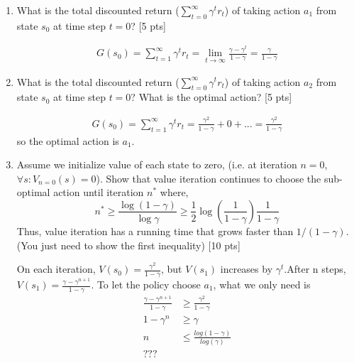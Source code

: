 \documentclass[11pt]{article}
\begin{document}
\begin{enumerate}[label=(\alph*)]
\item What is the total discounted return ($\sum_{t=0}^{\infty}\gamma^t r_t$) of taking action $a_1$ from state $s_0$ at time step $t=0$? [5 pts]

\begin{tcolorbox}[breakable]
  \begin{equation}
    \begin{aligned}
      G(s_0)=\sum_{t=1}^{\infty}\gamma^t r_t=\lim_{t\rightarrow \infty}\frac{\gamma-\gamma^t}{1-\gamma}=\frac{\gamma}{1-\gamma}
    \end{aligned}
  \end{equation}
\end{tcolorbox}

\item What is the total discounted return ($\sum_{t=0}^{\infty}\gamma^t r_t$) of taking action $a_2$ from state $s_0$ at time step $t=0$? What is the optimal action? [5 pts]

\begin{tcolorbox}[breakable]
  \begin{equation}
    \begin{aligned}
      G(s_0)=\sum_{t=1}^{\infty}\gamma^t r_t=\frac{\gamma^2}{1-\gamma}+0+...=\frac{\gamma^2}{1-\gamma}
    \end{aligned}
  \end{equation}so the optimal action is $a_1$.
\end{tcolorbox}

\item Assume we initialize value of each state to zero, (i.e. at iteration $n=0$, $\forall s: V_{n=0}(s) = 0$). Show that value iteration continues to choose the sub-optimal action until iteration $n^*$ where, 
$$n^* \geq \frac{\log(1-\gamma)}{\log\gamma} \geq \frac{1}{2} \log (\frac{1}{1-\gamma})\frac{1}{1-\gamma}$$
Thus, value iteration has a running time that grows faster than $1/(1-\gamma)$. (You just need to show the first inequality) [10 pts]

\begin{tcolorbox}[breakable]
On each iteration, $V(s_0)=\frac{\gamma^2}{1-\gamma}$, but $V(s_1)$ increases by $\gamma^t$.After n steps, $V(s_1)=\frac{\gamma-\gamma^{n+1}}{1-\gamma}$. To let the policy choose $a_1$, what we only need is\\
\begin{equation}
  \begin{aligned}
    \frac{\gamma-\gamma^{n+1}}{1-\gamma}&\geq\frac{\gamma^2}{1-\gamma}\\
    1-\gamma^n&\geq\gamma\\
    n&\leq\frac{log(1-\gamma)}{log(\gamma)}\\
    ???
  \end{aligned}
\end{equation}
\end{tcolorbox}

\end{enumerate}
\end{document}
